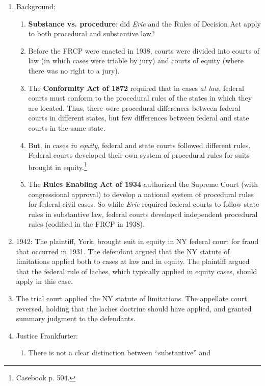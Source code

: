 \begin{enumerate}
    \item Background:
    \begin{enumerate}
        \item \textbf{Substance vs. procedure}: did \emph{Erie} and the Rules 
        of Decision Act apply to both procedural and substantive law?
        \item Before the FRCP were enacted in 1938, courts were divided into 
        courts of law (in which cases were triable by jury) and courts of 
        equity (where there was no right to a jury).
        \item The \textbf{Conformity Act of 1872} required that in cases 
        \emph{at law}, federal courts must conform to the procedural rules of 
        the states in which they are located. Thus, there were procedural 
        differences between federal courts in different states, but few 
        differences between federal and state courts in the same state.
        \item But, in cases \emph{in equity}, federal and state courts 
        followed different rules. Federal courts developed their own system of 
        procedural rules for suits brought in equity.\footnote{Casebook p. 
        504.}
        \item The \textbf{Rules Enabling Act of 1934} authorized the Supreme 
        Court (with congressional approval) to develop a national system of 
        procedural rules for federal civil cases. So while \emph{Erie} 
        required federal courts to follow state rules in substantive law, 
        federal courts developed independent procedural rules (codified in the 
        FRCP in 1938).
    \end{enumerate}
    \item 1942: The plaintiff, York, brought suit in equity in NY federal 
    court for fraud that occurred in 1931. The defendant argued that the NY 
    statute of limitations applied both to cases at law and in equity. The 
    plaintiff argued that the federal rule of laches, which typically applied 
    in equity cases, should apply in this case.
    \item The trial court applied the NY statute of limitations. The appellate 
    court reversed, holding that the laches doctrine should have applied, and 
    granted summary judgment to the defendants.
    \item Justice Frankfurter:
    \begin{enumerate}
        \item There is not a clear distinction between ``substantive'' and 

\end{enumerate}
\end{enumerate}
